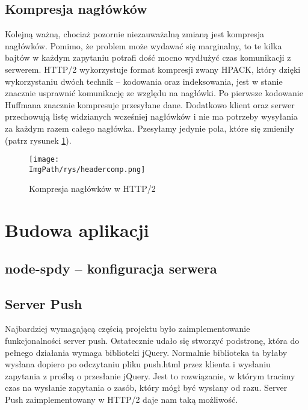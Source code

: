 \documentclass[a4paper,12pt,twoside,openany]{report}
\newcommand{\ImgPath}{.}
\begin{document}
\section{Kompresja nagłówków}

Kolejną ważną, chociaż pozornie niezauważalną zmianą jest kompresja nagłówków.
Pomimo, że problem może wydawać się marginalny, to te kilka bajtów w każdym zapytaniu potrafi dość mocno wydłużyć czas komunikacji z serwerem.
HTTP/2 wykorzystuje format kompresji zwany HPACK, który dzięki wykorzystaniu dwóch technik -- kodowania oraz indeksowania, jest w stanie znacznie usprawnić komunikację ze względu na nagłówki.
Po pierwsze kodowanie Huffmana znacznie kompresuje przesyłane dane.
Dodatkowo klient oraz serwer przechowują listę widzianych wcześniej nagłówków i nie ma potrzeby wysyłania za każdym razem całego nagłówka.
Pzesyłamy jedynie pola, które się zmieniły (patrz rysunek \ref{schematHeaderComp}).

\begin{figure}[!htbp]
	\begin{center}
\centering
\texttt{[image: \\ImgPath/rys/headercomp.png]}
\end{center}
	\caption{Kompresja nagłówków w HTTP/2}
	\label{schematHeaderComp}
\end{figure}

\chapter{Budowa aplikacji}

\section{node-spdy -- konfiguracja serwera}

\section{Server Push}

Najbardziej wymagającą częścią projektu było zaimplementowanie funkcjonalności server push.
Ostatecznie udało się stworzyć podstronę, która do pełnego działania wymaga biblioteki jQuery.
Normalnie biblioteka ta byłaby wysłana dopiero po odczytaniu pliku push.html przez klienta i wysłaniu zapytania z prośbą o przesłanie jQuery.
Jest to rozwiązanie, w którym tracimy czas na wysłanie zapytania o zasób, który mógł być wysłany od razu.
Server Push zaimplementowany w HTTP/2 daje nam taką możliwość.
\end{document}
